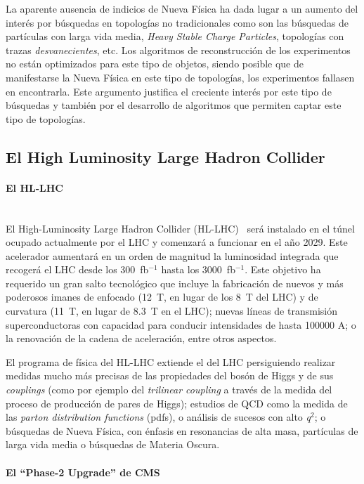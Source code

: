 La aparente ausencia de indicios de Nueva Física ha dada lugar a un aumento del interés por búsquedas en topologías no tradicionales como son las búsquedas de partículas con larga vida media, \emph{Heavy Stable Charge Particles}, topologías con trazas \emph{desvanecientes}, etc. Los algoritmos de reconstrucción de los experimentos no están optimizados para este tipo de objetos, siendo posible que de manifestarse la Nueva Física en este tipo de topologías, los experimentos fallasen en encontrarla. Este argumento justifica el creciente interés por este tipo de búsquedas y también por el desarrollo de algoritmos que permiten captar este tipo de topologías. 

\subsection{El High Luminosity Large Hadron Collider}

\paragraph{El HL-LHC\\\\}

El High-Luminosity Large Hadron Collider (HL-LHC)~\cite{HLLHC} será instalado en el túnel ocupado actualmente por el LHC y comenzará a funcionar en el año 2029. Este acelerador aumentará en un orden de magnitud la luminosidad integrada que recogerá el LHC desde los 300~fb$^{-1}$ hasta los 3000~fb$^{-1}$. Este objetivo ha requerido un gran salto tecnológico que incluye la fabricación de nuevos y más poderosos imanes de enfocado (12~T, en lugar de los 8~T del LHC) y de curvatura (11~T, en lugar de 8.3~T en el LHC); nuevas líneas de transmisión superconductoras con capacidad para conducir intensidades de hasta 100000 A; o la renovación de la cadena de aceleración, entre otros aspectos.

El programa de física del HL-LHC extiende el del LHC persiguiendo realizar medidas mucho más precisas de las propiedades del bosón de Higgs y de sus \emph{couplings} (como por ejemplo del \emph{trilinear coupling} a través de la medida del proceso de producción de pares de Higgs); estudios de QCD como la medida de las \emph{parton distribution functions} (pdfs), o análisis de sucesos con alto \emph{q$^2$}; o búsquedas de Nueva Física, con énfasis en resonancias de alta masa, partículas de larga vida media o búsquedas de Materia Oscura. 

\paragraph{El ``Phase-2 Upgrade'' de CMS\\\\}

